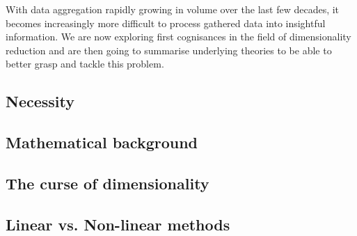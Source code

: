 With data aggregation rapidly growing in volume over the last few decades, it becomes increasingly more difficult to process gathered data into insightful information.
We are now exploring first cognisances in the field of dimensionality reduction and are then going to summarise underlying theories to be able to better grasp and tackle this problem.

\vfill



\subsection{Necessity}

\clearpage




\subsection{Mathematical background}




\subsection{The curse of dimensionality} \label{curseOfDimensionality}

\vfill
\clearpage


\subsection{Linear vs. Non-linear methods}

\clearpage
